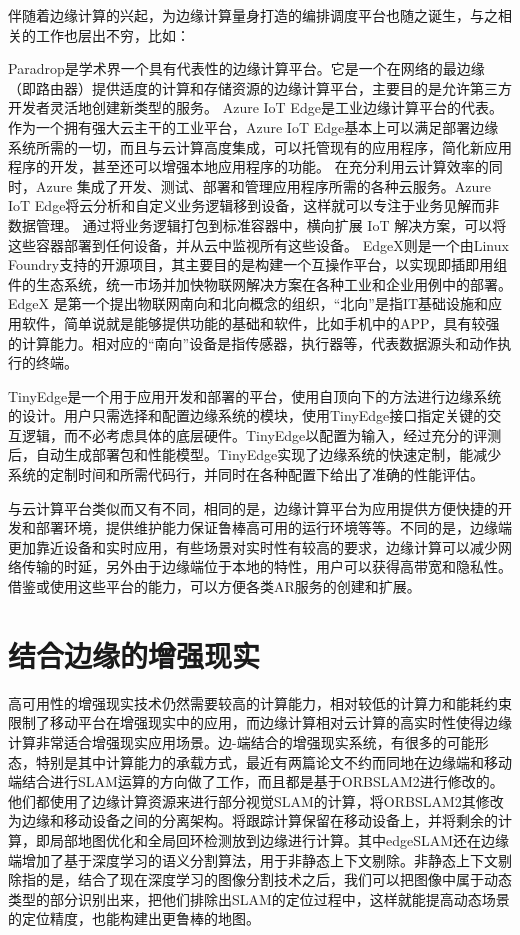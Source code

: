 伴随着边缘计算的兴起，为边缘计算量身打造的编排调度平台也随之诞生，与之相关的工作也层出不穷，比如：

Paradrop\cite{WilDasBan14,WilDasBan142,LiuWilBan16,Ban18}是学术界一个具有代表性的边缘计算平台。它是一个在网络的最边缘（即路由器）提供适度的计算和存储资源的边缘计算平台，主要目的是允许第三方开发者灵活地创建新类型的服务。
Azure IoT Edge\cite{AzureIoTEdge}是工业边缘计算平台的代表。作为一个拥有强大云主干的工业平台，Azure IoT Edge基本上可以满足部署边缘系统所需的一切，而且与云计算高度集成，可以托管现有的应用程序，简化新应用程序的开发，甚至还可以增强本地应用程序的功能。 在充分利用云计算效率的同时，Azure 集成了开发、测试、部署和管理应用程序所需的各种云服务。Azure IoT Edge将云分析和自定义业务逻辑移到设备，这样就可以专注于业务见解而非数据管理。 通过将业务逻辑打包到标准容器中，横向扩展 IoT 解决方案，可以将这些容器部署到任何设备，并从云中监视所有这些设备。
EdgeX\cite{EdgeXFoundry}则是一个由Linux Foundry支持的开源项目，其主要目的是构建一个互操作平台，以实现即插即用组件的生态系统，统一市场并加快物联网解决方案在各种工业和企业用例中的部署。EdgeX 是第一个提出物联网南向和北向概念的组织，“北向”是指IT基础设施和应用软件，简单说就是能够提供功能的基础和软件，比如手机中的APP，具有较强的计算能力。相对应的“南向”设备是指传感器，执行器等，代表数据源头和动作执行的终端。

TinyEdge\cite{ZhaZhaFan20}是一个用于应用开发和部署的平台，使用自顶向下的方法进行边缘系统的设计。用户只需选择和配置边缘系统的模块，使用TinyEdge接口指定关键的交互逻辑，而不必考虑具体的底层硬件。TinyEdge以配置为输入，经过充分的评测后，自动生成部署包和性能模型。TinyEdge实现了边缘系统的快速定制，能减少系统的定制时间和所需代码行，并同时在各种配置下给出了准确的性能评估。

与云计算平台类似而又有不同，相同的是，边缘计算平台为应用提供方便快捷的开发和部署环境，提供维护能力保证鲁棒高可用的运行环境等等。不同的是，边缘端更加靠近设备和实时应用，有些场景对实时性有较高的要求，边缘计算可以减少网络传输的时延，另外由于边缘端位于本地的特性，用户可以获得高带宽和隐私性。借鉴或使用这些平台的能力，可以方便各类AR服务的创建和扩展。

\section{结合边缘的增强现实}
高可用性的增强现实技术仍然需要较高的计算能力，相对较低的计算力和能耗约束限制了移动平台在增强现实中的应用，而边缘计算相对云计算的高实时性使得边缘计算非常适合增强现实应用场景。边-端结合的增强现实系统，有很多的可能形态，特别是其中计算能力的承载方式，最近有两篇论文不约而同地在边缘端和移动端结合进行SLAM运算的方向做了工作，而且都是基于ORBSLAM2进行修改的。他们都使用了边缘计算资源来进行部分视觉SLAM的计算，将ORBSLAM2其修改为边缘和移动设备之间的分离架构。将跟踪计算保留在移动设备上，并将剩余的计算，即局部地图优化和全局回环检测放到边缘进行计算。其中edgeSLAM\cite{ben2020edge}还在边缘端增加了基于深度学习的语义分割算法，用于非静态上下文剔除。非静态上下文剔除指的是，结合了现在深度学习的图像分割技术之后，我们可以把图像中属于动态类型的部分识别出来，把他们排除出SLAM的定位过程中，这样就能提高动态场景的定位精度，也能构建出更鲁棒的地图。

